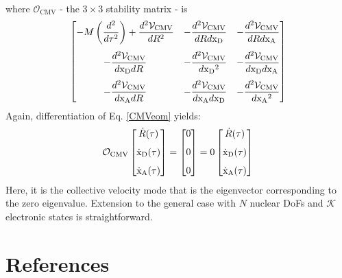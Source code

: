 \documentclass[%
 aip,
 jmp,%
 amsmath,amssymb,
reprint,%
]{revtex4-1}
\begin{document}
\begin{appendices}
\begin{eqnarray}
\end{eqnarray}
where $\mathcal{O}_{\mathrm{CMV}}$ - the $3\times3$ stability matrix - is 
\begin{eqnarray}
\left[\begin{matrix} - M \left( \dfrac{d^2 }{d\tau^2} \right) + \dfrac{d^2 \mathcal{V}_{\mathrm{CMV}}}{dR^2} &  - \dfrac{d^2 \mathcal{V}_{\mathrm{CMV}}}{dR d\mathrm{x_{D}}}  &  - \dfrac{d^2 \mathcal{V}_{\mathrm{CMV}}}{dR d\mathrm{x_{A}}} \vspace*{0.25cm} \\ - \dfrac{d^2 \mathcal{V}_{\mathrm{CMV}}}{d\mathrm{x_{D}} dR } & - \dfrac{d^2 \mathcal{V}_{\mathrm{CMV}}}{d\mathrm{x_{D}}^2} & - \dfrac{d^2 \mathcal{V}_{\mathrm{CMV}}}{d\mathrm{x_{D}}d\mathrm{x_{A}}}  \vspace*{0.25cm} \\
- \dfrac{d^2 \mathcal{V}_{\mathrm{CMV}}}{d\mathrm{x_{A}} dR} & - \dfrac{d^2 \mathcal{V}_{\mathrm{CMV}}}{d\mathrm{x_{A}}d\mathrm{x_{D}}}   &  - \dfrac{d^2 \mathcal{V}_{\mathrm{CMV}}}{d\mathrm{x_{A}}^2} \end{matrix} \right]  \nonumber \\
\end{eqnarray}
Again, differentiation of Eq. \eqref{CMVeom} yields: 
\begin{eqnarray}
\mathcal{O}_{\mathrm{CMV}} \left[\begin{matrix} \dot{R}(\tau) \vspace*{0.25cm} \\ \mathrm{\dot{x}_{D}}(\tau) \vspace*{0.25cm} \\ \mathrm{\dot{x}_{A}}(\tau)\end{matrix} \right] = \left[\begin{matrix} 0 \vspace*{0.25cm} \\ 0 \vspace*{0.25cm} \\ 0  \end{matrix} \right] = 0 \left[\begin{matrix} \dot{R}(\tau) \vspace*{0.25cm} \\ \mathrm{\dot{x}_{D}}(\tau) \vspace*{0.25cm} \\ \mathrm{\dot{x}_{A}}(\tau) \end{matrix} \right]
\end{eqnarray}
Here, it is the collective velocity mode that is the eigenvector corresponding to the zero eigenvalue. Extension to the general case with $N$ nuclear DoFs and $\mathcal{K}$ electronic states is straightforward.
\end{appendices}

\section*{References}
%

\end{document}
